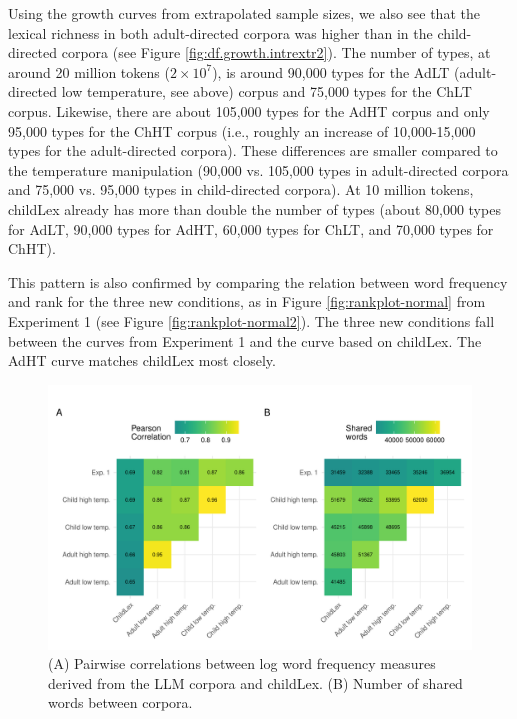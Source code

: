 \documentclass[manuscript]{stjour}
\begin{document}
Using the growth curves from extrapolated sample sizes, we also see that the lexical richness in both adult-directed corpora was higher than in the child-directed corpora (see Figure \ref{fig:df.growth.intrextr2}). The number of types, at around 20 million tokens ($2 \times 10^7$), is around 90,000 types for the AdLT (adult-directed low temperature, see above) corpus and 75,000 types for the ChLT corpus. Likewise, there are about 105,000 types for the AdHT corpus and only 95,000 types for the ChHT corpus (i.e., roughly an increase of 10,000-15,000 types for the adult-directed corpora). These differences are smaller compared to the temperature manipulation (90,000 vs. 105,000 types in adult-directed corpora and 75,000 vs. 95,000 types in child-directed corpora). At 10 million tokens, childLex already has more than double the number of types (about 80,000 types for AdLT, 90,000 types for AdHT, 60,000 types for ChLT, and 70,000 types for ChHT). 

This pattern is also confirmed by comparing the relation between word frequency and rank for the three new conditions, as in Figure \ref{fig:rankplot-normal} from Experiment 1 (see Figure \ref{fig:rankplot-normal2}). The three new conditions fall between the curves from Experiment 1 and the curve based on childLex. The AdHT curve matches childLex most closely. 

\begin{figure}[!htbp]
  \centerline{
    \includegraphics[width=1.1\textwidth]{figures/combined_plotc.pdf}}
    \caption{(A) Pairwise correlations between log word frequency measures derived from the LLM corpora and childLex. (B) Number of shared words between corpora.}
    \label{fig:combined_plotc}
\end{figure}
\end{document}
